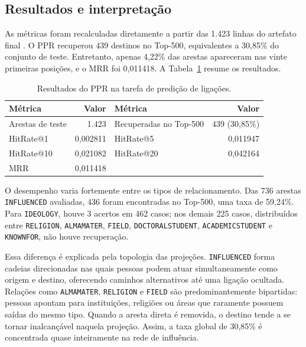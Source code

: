 \documentclass[10pt,a4paper]{article}
\begin{document}
\subsection{Resultados e interpretação}

As métricas foram recalculadas diretamente a partir das 1.423 linhas do artefato final . O PPR recuperou 439 destinos no Top-500, equivalentes a 30,85\% do conjunto de teste. Entretanto, apenas 4,22\% das arestas apareceram nas vinte primeiras posições, e o MRR foi 0,011418. A Tabela~\ref{tab:ppr-resultados} resume os resultados.

\begin{table}[htbp]
  \centering
  \caption{Resultados do PPR na tarefa de predição de ligações.}
  \label{tab:ppr-resultados}
  \begin{tabular}{lr@{\qquad}lr}
    \toprule
    Métrica & Valor & Métrica & Valor \\
    \midrule
    Arestas de teste & 1.423 & Recuperadas no Top-500 & 439 (30,85\%) \\
    HitRate@1 & 0,002811 & HitRate@5 & 0,011947 \\
    HitRate@10 & 0,021082 & HitRate@20 & 0,042164 \\
    MRR & 0,011418 & & \\
    \bottomrule
  \end{tabular}
\end{table}

O desempenho varia fortemente entre os tipos de relacionamento. Das 736 arestas \texttt{INFLUENCED} avaliadas, 436 foram encontradas no Top-500, uma taxa de 59,24\%. Para \texttt{IDEOLOGY}, houve 3 acertos em 462 casos; nos demais 225 casos, distribuídos entre \texttt{RELIGION}, \texttt{ALMAMATER}, \texttt{FIELD}, \texttt{DOCTORALSTUDENT}, \texttt{ACADEMICSTUDENT} e \texttt{KNOWNFOR}, não houve recuperação.

Essa diferença é explicada pela topologia das projeções. \texttt{INFLUENCED} forma cadeias direcionadas nas quais pessoas podem atuar simultaneamente como origem e destino, oferecendo caminhos alternativos até uma ligação ocultada. Relações como \texttt{ALMAMATER}, \texttt{RELIGION} e \texttt{FIELD} são predominantemente bipartidas: pessoas apontam para instituições, religiões ou áreas que raramente possuem saídas do mesmo tipo. Quando a aresta direta é removida, o destino tende a se tornar inalcançável naquela projeção. Assim, a taxa global de 30,85\% é concentrada quase inteiramente na rede de influência.
\end{document}
